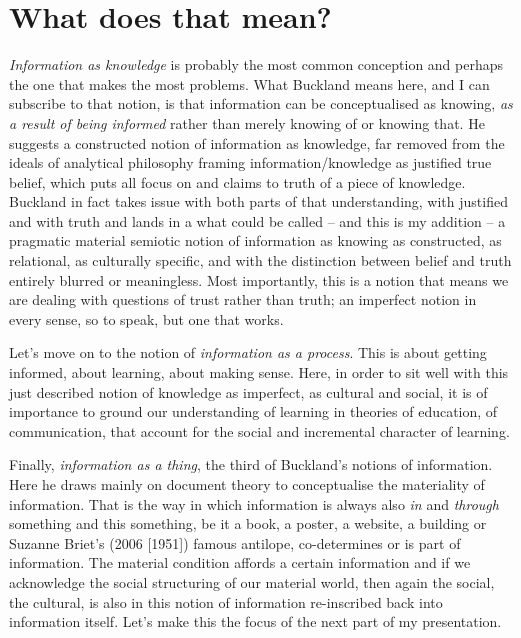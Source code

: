﻿\documentclass[a4paper,
fontsize=11pt,
oneside,
numbers=noperiodatend,
parskip=half-,
bibliography=totoc,
final
]{scrartcl}
\begin{document}
\section*{What does that mean?}\label{what-does-that-mean}

\emph{Information as knowledge} is probably the most common conception
and perhaps the one that makes the most problems. What Buckland means
here, and I can subscribe to that notion, is that information can be
conceptualised as knowing, \emph{as a result of being informed} rather
than merely knowing of or knowing that. He suggests a constructed notion
of information as knowledge, far removed from the ideals of analytical
philosophy framing information/knowledge as justified true belief, which
puts all focus on and claims to truth of a piece of knowledge. Buckland
in fact takes issue with both parts of that understanding, with
justified and with truth and lands in a what could be called -- and this
is my addition -- a pragmatic material semiotic notion of information as
knowing as constructed, as relational, as culturally specific, and with
the distinction between belief and truth entirely blurred or
meaningless. Most importantly, this is a notion that means we are
dealing with questions of trust rather than truth; an imperfect notion
in every sense, so to speak, but one that works.

Let's move on to the notion of \emph{information as a process}. This is
about getting informed, about learning, about making sense. Here, in
order to sit well with this just described notion of knowledge as
imperfect, as cultural and social, it is of importance to ground our
understanding of learning in theories of education, of communication,
that account for the social and incremental character of learning.

Finally, \emph{information as a thing}, the third of Buckland's notions
of information. Here he draws mainly on document theory to conceptualise
the materiality of information. That is the way in which information is
always also \emph{in} and \emph{through} something and this something,
be it a book, a poster, a website, a building or Suzanne Briet's (2006
{[}1951{]}) famous antilope, co-determines or is part of information.
The material condition affords a certain information and if we
acknowledge the social structuring of our material world, then again the
social, the cultural, is also in this notion of information re-inscribed
back into information itself. Let's make this the focus of the next part
of my presentation.
\end{document}

